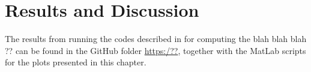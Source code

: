 \chapter{Results and Discussion}
\label{chap:Results}


The results from running the codes described in  for computing the blah blah blah ?? can be found in the GitHub folder  \url{https:/??}, together with the MatLab scripts for the plots presented in this chapter. 
